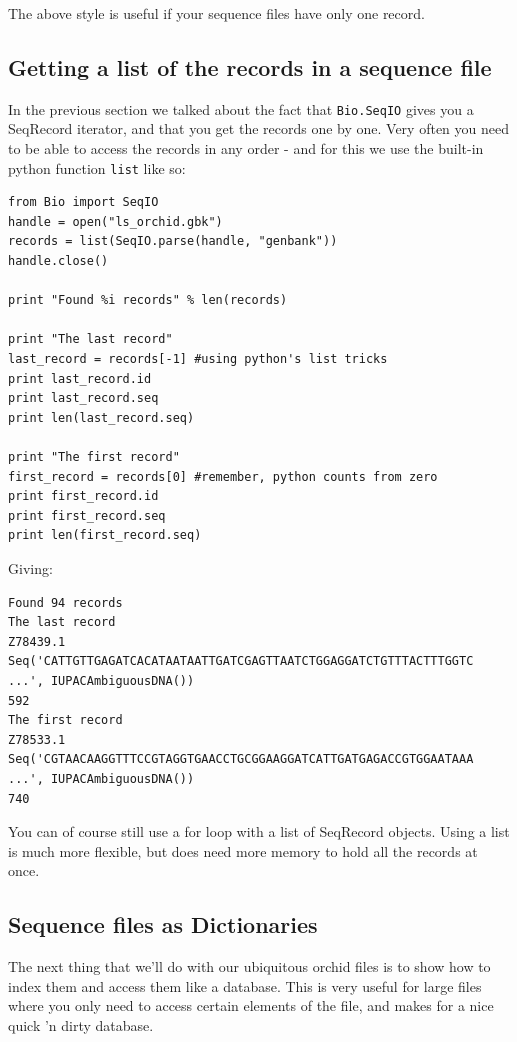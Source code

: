 \documentclass{report}
\begin{document}
\noindent The above style is useful if your sequence files have only one record.

\subsection{Getting a list of the records in a sequence file}

In the previous section we talked about the fact that \verb|Bio.SeqIO| gives you a SeqRecord iterator, and that you get the records one by one.  Very often you need to be able to access the records in any order - and for this we use the built-in python function \verb|list| like so:

\begin{verbatim}
from Bio import SeqIO
handle = open("ls_orchid.gbk")
records = list(SeqIO.parse(handle, "genbank"))
handle.close()

print "Found %i records" % len(records)

print "The last record"
last_record = records[-1] #using python's list tricks
print last_record.id
print last_record.seq
print len(last_record.seq)

print "The first record"
first_record = records[0] #remember, python counts from zero
print first_record.id
print first_record.seq
print len(first_record.seq)
\end{verbatim}

Giving:

\begin{verbatim}
Found 94 records
The last record
Z78439.1
Seq('CATTGTTGAGATCACATAATAATTGATCGAGTTAATCTGGAGGATCTGTTTACTTTGGTC ...', IUPACAmbiguousDNA())
592
The first record
Z78533.1
Seq('CGTAACAAGGTTTCCGTAGGTGAACCTGCGGAAGGATCATTGATGAGACCGTGGAATAAA ...', IUPACAmbiguousDNA())
740
\end{verbatim}

You can of course still use a for loop with a list of SeqRecord objects.  Using a list is much more flexible, but does need more memory to hold all the records at once.

\subsection{Sequence files as Dictionaries}

The next thing that we'll do with our ubiquitous orchid files is to show how to index them and access them like a database. This is very useful for large files where you only need to access certain elements of the file, and makes for a nice quick 'n dirty database.
\end{document}
